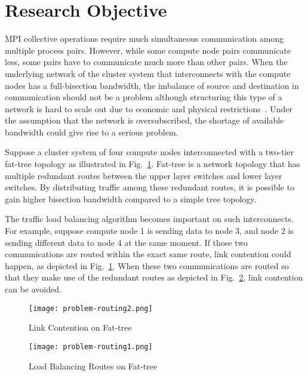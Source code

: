 \section{Research Objective}\label{sec:iii-background}

MPI collective operations require much simultaneous communication among
multiple process pairs. However, while some compute node pairs
communicate less, some pairs have to communicate much more than other
pairs. When the underlying network of the cluster system that
interconnects with the compute nodes has a full-bisection bandwidth,
the imbalance of source and destination in communication should not be a
problem although structuring this type of a network is hard to scale out due
to economic and physical restrictions~\autocite{Al-Fares2008}. Under the
assumption that the network is oversubscribed, the shortage of available
bandwidth could give rise to a serious problem.

Suppose a cluster system of four compute nodes interconnected with a
two-tier fat-tree topology as illustrated in Fig.~\ref{fig:problem-routing1}.
Fat-tree is a network topology that has multiple redundant routes between the
upper layer switches and lower layer switches. By distributing traffic among
these redundant routes, it is possible to gain higher bisection bandwidth
compared to a simple tree topology.

The traffic load balancing algorithm becomes important on such interconnects.
For example, suppose
compute node 1 is sending data to node 3, and node 2 is sending
different data to node 4 at the same moment. If those two communications
are routed within the exact same route, link contention could happen, as
depicted in Fig.~\ref{fig:problem-routing1}. When these two
communications are routed so that they make use of the redundant routes
as depicted in Fig.~\ref{fig:problem-routing2}, link contention can be
avoided.

\begin{figure}
    \centering
    \texttt{[image: problem-routing2.png]}
    \caption{Link Contention on Fat-tree}%
    \label{fig:problem-routing1}
\end{figure}

\begin{figure}
    \centering
    \texttt{[image: problem-routing1.png]}
    \caption{Load Balancing Routes on Fat-tree}%
    \label{fig:problem-routing2}
\end{figure}

